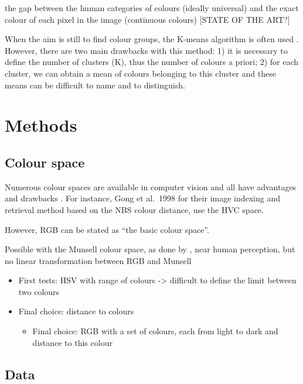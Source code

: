 \documentclass[11pt,a4paper]{article}
\begin{document}
the gap between the human categories of colours (ideally universal)
and the exact colour of each pixel in the image (continuous colours)
\cite{khan2012, khan2013} [STATE OF THE ART?]

When the aim is still to find colour groups, the
K-means algorithm is often used \cite[see e.g.][]{yendrikhovskij2001,konyushkova2015,hulee2007}. However, there are two main
drawbacks with this method: 1) it is necessary to define the number of
clusters (K), thus the number of colours a priori; 2) for each cluster,
we can obtain a mean of colours belonging to this cluster and these
means can be difficult to name and to distinguish.

\section{Methods}\label{methods}

\subsection{Colour space}
\label{sec:colour-space}
Numerous colour spaces are available in computer vision and all have advantages and drawbacks \cite{tkalcictasic2003}.  For instance, Gong et al.~1998
for their image indexing and retrieval method based on the NBS colour
distance, use the HVC space.


However, RGB can be stated as ``the basic colour space''\cite{tkalcictasic2003}.


Possible with the Munsell colour space, as done by \citet{kimbaelee2007}, near human perception, but no linear transformation between
RGB and Munsell \cite[see e.g.][]{zhangsokhansanjwuetal1998}

\begin{itemize}
	
	\item
	First tests: HSV with range of colours -\textgreater{} difficult to
	define the limit between two colours
	\item
	Final choice: distance to colours
	
	\begin{itemize}
		\item
		Final choice: RGB with a set of colours, each from light to dark and
		distance to this colour
	\end{itemize}
\end{itemize}



\subsection{Data}
\end{document}
